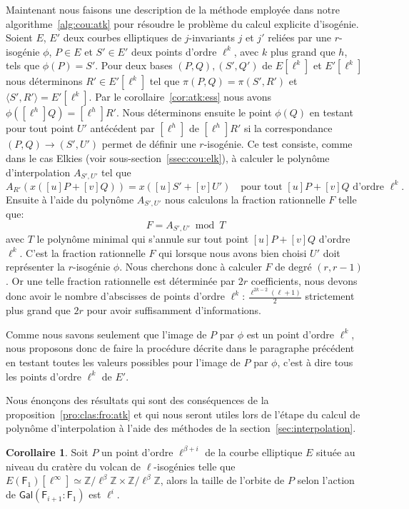 \documentclass[10pt,a4paper]{book}
\theoremstyle{plain}
\theoremstyle{definition}
\theoremstyle{definition}
\theoremstyle{definition}
\newtheorem{cor}[thm]{Corollaire}
\theoremstyle{definition}
\theoremstyle{definition}
\theoremstyle{remark}
\theoremstyle{remark}
\theoremstyle{definition}
\begin{document}
Maintenant nous faisons une description de la méthode employée dans notre 
algorithme~\ref{alg:cou:atk} pour résoudre le problème du calcul explicite 
d'isogénie.
Soient $E$, $E'$ deux courbes elliptiques de $j$-invariants $j$ et $j'$ 
reliées par une $r$-isogénie $\phi$, $P \in E$ et $S' \in E'$ deux points 
d'ordre $\ell^{k}$, avec $k$  plus grand que $h$, tels que $\phi(P)=S'$. Pour 
deux bases $(P,Q),(S',Q')$ de $E[\ell^k]$ et $E'[\ell^k]$ nous déterminons 
$R'\in E'[\ell^k]$ tel que $\pi(P,Q)=\pi(S',R')$ et $\langle S',R' \rangle =E'[\ell^k]$. %
Par le corollaire~\ref{cor:atk:ess} nous avons $\phi([\ell^h]Q)=[\ell^h]R'$. 
Nous déterminons ensuite le point $\phi(Q)$ en testant pour tout point $U'$ 
antécédent par $[\ell^h]$ de $[\ell^h]R'$ si la correspondance $(P,Q) 
\rightarrow (S',U')$ permet de définir une $r$-isogénie. Ce test consiste, 
comme dans le cas Elkies (voir sous-section~\ref{ssec:cou:elk}), à calculer le 
polynôme d'interpolation $A_{S',U'}$ tel que 
\[
A_{R'}(x([u]P+[v]Q))=x([u]S'+[v]U') \quad \text{pour tout $[u]P+[v]Q$ d'ordre $\ell^k$}.
\]
Ensuite à l'aide du polynôme $A_{S',U'}$ nous calculons la fraction rationnelle
$F$ telle que:
\[
F=A_{S',U'} \bmod T
\]
avec $T$ le polynôme minimal qui s'annule sur tout point $[u]P +[v]Q$ 
d'ordre $\ell^k$. C'est la fraction rationnelle $F$ qui lorsque nous avons bien 
choisi $U'$ doit représenter la $r$-isogénie $\phi$. Nous cherchons 
donc à calculer $F$ de degré $(r,r-1)$. Or une telle fraction rationnelle est 
déterminée par $2r$ coefficients, nous devons donc avoir le nombre d'abscisses de 
points d'ordre $\ell^k$: $\frac{\ell^{2k-2}(\ell+1)}{2}$ strictement plus grand
que $2r$ pour avoir suffisamment d'informations.

Comme nous savons seulement que l'image de $P$ par $\phi$ est un point d'ordre 
$\ell^k$, nous proposons donc de faire la procédure décrite 
dans le paragraphe précédent en testant toutes les valeurs possibles pour 
l'image de $P$ par $\phi$, c'est à dire tous les points d'ordre $\ell^k$ de 
$E'$.

Nous énonçons des résultats qui sont des conséquences de la 
proposition~\ref{pro:clas:fro:atk} et qui nous seront utiles lors de l'étape 
du calcul de polynôme d'interpolation à l'aide des méthodes de la 
section~\ref{sec:interpolation}.

\begin{cor}
Soit $P$ un point d'ordre $\ell^{\beta+i}$ de la courbe elliptique $E$ située 
au niveau du cratère du volcan de $\ell$-isogénies telle que $E(\mathsf{F}_
{1})[\ell^{\infty}] \simeq \mathbb{Z}/ \ell^{\beta} \mathbb{Z} \times 
\mathbb{Z}/ \ell^{\beta}\mathbb{Z}$, alors la taille de l'orbite de $P$ selon 
l'action de $\mathsf{Gal}(\mathsf{F}_{i+1}:\mathsf{F}_{1})$ est 
$\ell^i$. 
\end{cor}
\end{document}
